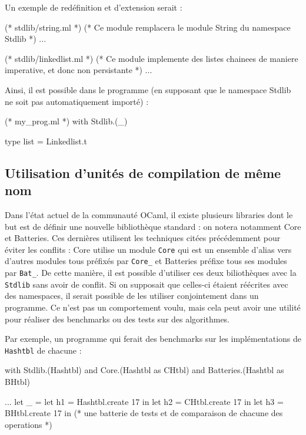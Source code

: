 \documentclass[11pt,a4paper]{report}
\begin{document}
Un exemple de redéfinition et d'extension serait :
\begin{OCaml}
(* stdlib/string.ml *)
(* Ce module remplacera le module String du namespace Stdlib *)
...
\end{OCaml}

\begin{OCaml}
(* stdlib/linkedlist.ml *)
(* Ce module implemente des listes chainees de maniere imperative, et donc non
   persistante *)
...
\end{OCaml}

Ainsi, il est possible dans le programme (en supposant que le namespace Stdlib
ne soit pas automatiquement importé) :

\begin{OCaml}
(* my_prog.ml *)
with Stdlib.(_)

type list = Linkedlist.t
\end{OCaml}

\subsection{Utilisation d'unités de compilation de même nom}

Dans l'état actuel de la communauté OCaml, il existe plusieurs libraries dont le
but est de définir une nouvelle bibliothèque standard : on notera notamment Core
et Batteries. Ces dernières utilisent les techniques citées précédemment pour
éviter les conflits : Core utilise un module \texttt{Core} qui est un ensemble
d'alias vers d'autres modules tous préfixés par \texttt{Core_} et Batteries
préfixe tous ses modules par \texttt{Bat_}. De cette manière, il est possible
d'utiliser ces deux biliothèques avec la \texttt{Stdlib} sans avoir de
conflit. Si on supposait que celles-ci étaient réécrites avec des namespaces, il
serait possible de les utiliser conjointement dans un programme. Ce n'est pas un
comportement voulu, mais cela peut avoir une utilité pour réaliser des
benchmarks ou des tests sur des algorithmes.

Par exemple, un programme qui ferait des benchmarks sur les implémentations de
\texttt{Hashtbl} de chacune :
\begin{OCaml}
with Stdlib.(Hashtbl)
and Core.(Hashtbl as CHtbl)
and Batteries.(Hashtbl as BHtbl)

...
let _ =
  let h1 = Hashtbl.create 17 in
  let h2 = CHtbl.create 17 in
  let h3 = BHtbl.create 17 in
  (* une batterie de tests et de comparaison de chacune des operations *)
\end{OCaml}
\end{document}
